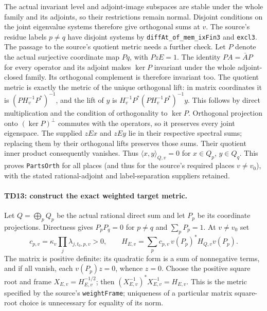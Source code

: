 The actual invariant level and adjoint-image subspaces are stable
under the whole family and its adjoints, so their restrictions remain
normal. Disjoint conditions on the joint eigenvalue systems therefore
give orthogonal sums at $v$. The source's residue labels $p\ne q$
have disjoint systems by \texttt{diffAt\_of\_mem\_ixFin3} and
\texttt{excl3}. The passage to the source's quotient metric needs a further check.
Let $P$ denote the actual surjective coordinate map $Pq$, with $PzE=1$.
The identity $PA=\bar A P$ for every operator and its adjoint makes
$\ker P$ invariant under the whole adjoint-closed family. Its orthogonal
complement is therefore invariant too. The quotient metric is exactly
the metric of the unique orthogonal lift: in matrix coordinates it is
$(PH_v^{-1}P^*)^{-1}$, and the lift of $y$ is
$H_v^{-1}P^*(PH_v^{-1}P^*)^{-1}y$. This follows by direct multiplication
and the condition of orthogonality to $\ker P$. Orthogonal projection
onto $(\ker P)^\perp$ commutes with the operators, so it preserves every
joint eigenspace. The supplied $zE x$ and $zE y$ lie in their respective
spectral sums; replacing them by their orthogonal lifts preserves those
sums. Their quotient inner product consequently vanishes. Thus
$\langle x,y\rangle_{Q,v}=0$ for $x\in Q_p$, $y\in Q_q$.
This proves \texttt{PartsOrth} for all places (and thus for the
source's required places $v\ne v_0$), with the stated rational-adjoint
and label-separation suppliers retained.

\paragraph{TD13: construct the exact weighted target metric.}
Let $Q=\bigoplus_p Q_p$ be the actual rational direct sum and let
$P_p$ be its coordinate projections. Directness gives
$P_pP_q=0$ for $p\ne q$ and $\sum_pP_p=1$. At $v\ne v_0$ set
\[
 c_{p,v}=\kappa_v\prod_j\lambda_{j,t_0,p,v}>0,\qquad
 H_{E,v}=\sum_p c_{p,v}\,v(P_p)^*H_{Q,v}v(P_p).
 \tag{TD.10}
\]
The matrix is positive definite: its quadratic form is a sum of
nonnegative terms, and if all vanish, each $v(P_p)z=0$, whence $z=0$.
Choose the positive square root and frame $X_{E,v}=H_{E,v}^{-1/2}$;
then $(X_{E,v}^{-1})^*X_{E,v}^{-1}=H_{E,v}$. This is the metric
specified by the source's \texttt{weightFrame}; uniqueness of a
particular matrix square-root choice is unnecessary for equality of
its norm.

